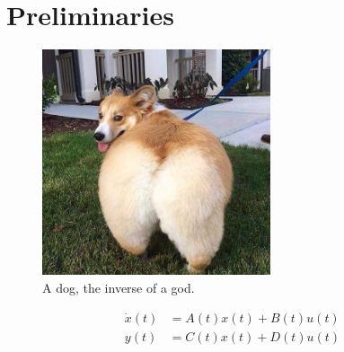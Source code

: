 \chapter{Preliminaries} \label{sec: Preliminaries}

\lipsum[1-3]

\begin{figure}[htb!] \centering
    \includegraphics[width=0.6\textwidth]{imgs/dog.jpg}

    \caption{A dog, the inverse of a god.}
    \label{fig: Corgi}
\end{figure}

\lipsum[4-5]
\begin{align*}
    \dot{x}(t) &= A(t) x(t) + B(t) u(t) \\
          y(t) &= C(t) x(t) + D(t) u(t)
\end{align*}

\lipsum[6-8]